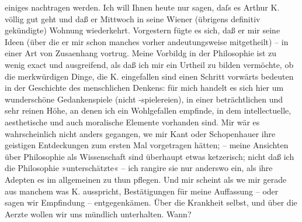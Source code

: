 \begin{ledgroupsized}[t]{13cm}
               einiges nachtragen werden. Ich will Ihnen heute nur sagen, daſs es Arthur K. völlig gut geht und daß er Mittwoch in seine Wiener (übrigens definitiv gekündigte) Wohnung
               wiederkehrt. Vorgestern fügte es sich, daß er mir seine Ideen (über die er mir schon
               manches vorher andeutungsweise mitgetheilt) – in einer Art von Zusa{\geminationm}enhang vortrug. Meine \strikeout{\textcolor{gray}{×}\-\textcolor{gray}{×}\-\textcolor{gray}{×}\-\textcolor{gray}{×}\-\textcolor{gray}{×}} Vorbildg in der Philosophie \introOben{}ist\introOben{} zu wenig exact und
               ausgreifend, als daß ich mir ein Urtheil zu bilden vermöchte, ob die merkwürdigen
               Dinge, die K. eingefallen sind einen Schritt
               vorwärts bedeuten in der Geschichte des menschlichen Denkens: für mich handelt es
               sich hier um wunderschöne Gedankenspiele (nicht -spielereien), in einer
               beträchtlichen und sehr reinen Höhe, an denen ich ein Wohlgefallen empfinde, in dem
                   intellectuelle, aesthetische und auch moralische
               Elemente vorhanden sind. Mir wär es wahrscheinlich nicht anders gegangen, we{\geminationn} mir Kant oder
                  Schopenhauer ihre geistigen Entdeckungen zum
               ersten Mal vorgetragen hätten; – meine Ansichten über Philosophie als Wissenschaft
                  {\pb}sind überhaupt etwas ketzerisch; nicht daß ich die
               Philosophie »unterschätzte« – ich rangire sie nur anderswo ein, als ihre Adepten es
               im allgemeinen zu thun pflegen. Und mir scheint als we{\geminationn}
               mir gerade aus manchem was K. ausspricht,
               Bestätigungen für meine Auffassung – oder sagen wir Empfindung – entgegenkämen. Über
               die Krankheit selbst, und über die Aerzte wollen wir uns mündlich unterhalten. Wann?

\end{ledgroupsized}
